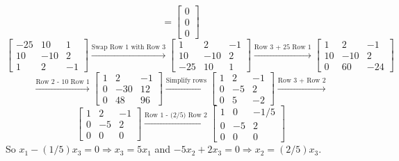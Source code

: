 \begin{enumerate}[font=\bfseries]
\begin{enumerate}
\[                =
                \begin{bmatrix}
                    0 \\
                    0 \\
                    0
                \end{bmatrix}
            \]
            \[
                \begin{bmatrix}
                    -25 & 10 & 1 \\
                    10 & -10 & 2 \\
                    1 & 2 & -1
                \end{bmatrix}
                \overset{\text{Swap Row 1 with Row 3}}{\longrightarrow}
                \begin{bmatrix}
                    1 & 2 & -1 \\
                    10 & -10 & 2 \\
                    -25 & 10 & 1
                \end{bmatrix}
                \overset{\text{Row 3 + 25 Row 1}}{\longrightarrow}
                \begin{bmatrix}
                    1 & 2 & -1 \\
                    10 & -10 & 2 \\
                    0 & 60 & -24
                \end{bmatrix}
            \]
            \[
                \overset{\text{Row 2 - 10 Row 1}}{\longrightarrow}
                \begin{bmatrix}
                    1 & 2 & -1 \\
                    0 & -30 & 12 \\
                    0 & 48 & 96
                \end{bmatrix}
                \overset{\text{Simplify rows}}{\longrightarrow}
                \begin{bmatrix}
                    1 & 2 & -1 \\
                    0 & -5 & 2 \\
                    0 & 5 & -2
                \end{bmatrix}
                \overset{\text{Row 3 + Row 2}}{\longrightarrow}
            \]
            \[
                \begin{bmatrix}
                    1 & 2 & -1 \\
                    0 & -5 & 2 \\
                    0 & 0 & 0
                \end{bmatrix}
                \overset{\text{Row 1 - (2/5) Row 2}}{\longrightarrow}
                \begin{bmatrix}
                    1 & 0 & -1/5 \\
                    0 & -5 & 2 \\
                    0 & 0 & 0
                \end{bmatrix}
            \]
            So $x_1 - (1/5)x_3 = 0 \Rightarrow x_3 = 5x_1$
            and $-5x_2 + 2x_3 = 0 \Rightarrow x_2 = (2/5)x_3$.


\end{enumerate}
\end{enumerate}

